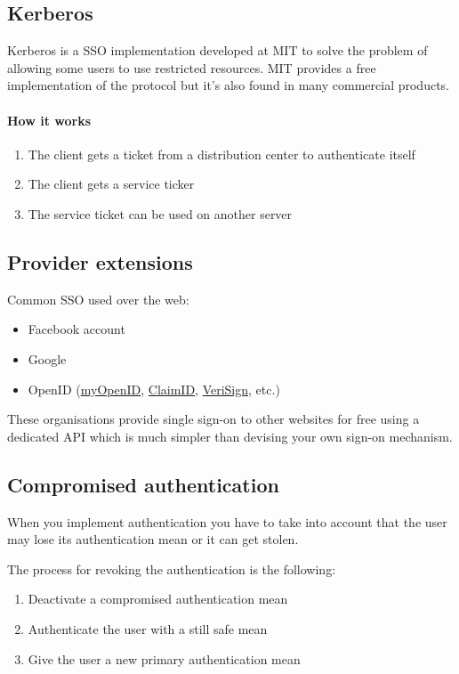 \subsection{Kerberos}
Kerberos is a SSO implementation developed at MIT to solve the problem of
allowing some users to use restricted resources. MIT provides a free
implementation of the protocol but it's also found in many commercial
products.

\paragraph{How it works}
\begin{enumerate}
\item The client gets a ticket from a distribution center to authenticate itself
\item The client gets a service ticker
\item The service ticket can be used on another server
\end{enumerate}

\subsection{Provider extensions}
Common SSO used over the web:
\begin{itemize}
\item Facebook account
\item Google
\item OpenID (\href{http://myopenid.com/}{myOpenID},
\href{http://claimid.com/}{ClaimID},
\href{http://pip.verisignlabs.com/}{VeriSign}, etc.)
\end{itemize}
These organisations provide single sign-on to other websites for free
using a dedicated API which is much simpler than devising your own
sign-on mechanism.

\subsection{Compromised authentication}
When you implement authentication you have to take into account that the user
may lose its authentication mean or it can get stolen.

The process for revoking the authentication is the following:
\begin{enumerate}
\item Deactivate a compromised authentication mean
\item Authenticate the user with a still safe mean
\item Give the user a new primary authentication mean
\end{enumerate}

